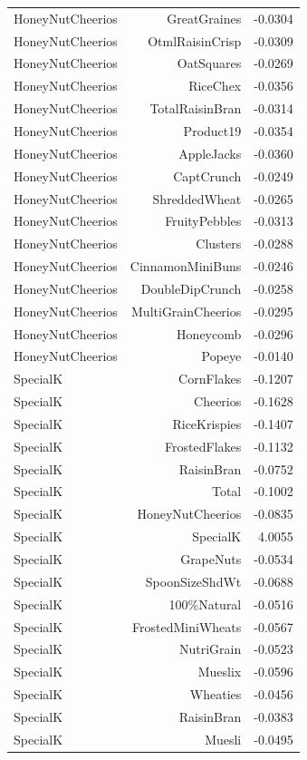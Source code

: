 \begin{longtable}{@{}lrr@{}}
HoneyNutCheerios & GreatGraines & -0.0304 \\
HoneyNutCheerios & OtmlRaisinCrisp & -0.0309 \\
HoneyNutCheerios & OatSquares & -0.0269 \\
HoneyNutCheerios & RiceChex & -0.0356 \\
HoneyNutCheerios & TotalRaisinBran & -0.0314 \\
HoneyNutCheerios & Product19 & -0.0354 \\
HoneyNutCheerios & AppleJacks & -0.0360 \\
HoneyNutCheerios & CaptCrunch & -0.0249 \\
HoneyNutCheerios & ShreddedWheat & -0.0265 \\
HoneyNutCheerios & FruityPebbles & -0.0313 \\
HoneyNutCheerios & Clusters & -0.0288 \\
HoneyNutCheerios & CinnamonMiniBuns & -0.0246 \\
HoneyNutCheerios & DoubleDipCrunch & -0.0258 \\
HoneyNutCheerios & MultiGrainCheerios & -0.0295 \\
HoneyNutCheerios & Honeycomb & -0.0296 \\
HoneyNutCheerios & Popeye & -0.0140 \\
SpecialK & CornFlakes & -0.1207 \\
SpecialK & Cheerios & -0.1628 \\
SpecialK & RiceKrispies & -0.1407 \\
SpecialK & FrostedFlakes & -0.1132 \\
SpecialK & RaisinBran & -0.0752 \\
SpecialK & Total & -0.1002 \\
SpecialK & HoneyNutCheerios & -0.0835 \\
SpecialK & SpecialK & 4.0055 \\
SpecialK & GrapeNuts & -0.0534 \\
SpecialK & SpoonSizeShdWt & -0.0688 \\
SpecialK & 100\%Natural & -0.0516 \\
SpecialK & FrostedMiniWheats & -0.0567 \\
SpecialK & NutriGrain & -0.0523 \\
SpecialK & Mueslix & -0.0596 \\
SpecialK & Wheaties & -0.0456 \\
SpecialK & RaisinBran & -0.0383 \\
SpecialK & Muesli & -0.0495 \\

\end{longtable}

